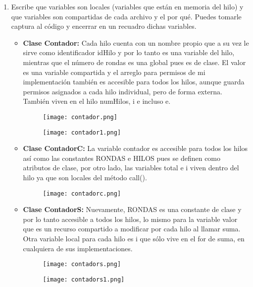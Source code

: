 \documentclass{article}
\begin{document}
\begin{enumerate}
    \item Escribe que variables son locales (variables que están en memoria del hilo) y que variables son compartidas de cada archivo y el por qué. Puedes tomarle captura al código y encerrar en un recuadro dichas variables.\\
    \begin{itemize}
        \item \textbf{Clase Contador:} Cada hilo cuenta con un nombre propio que a su vez le sirve como identificador idHilo y por lo tanto es una variable del hilo, mientras que el número de rondas es una  global pues es de clase. El valor es una variable compartida y el arreglo para permisos de mi implementación también es accesible para todos los hilos, aunque guarda permisos asignados a cada hilo individual, pero de forma externa. También viven en el hilo numHilos, i e incluso e.
        \begin{figure}[!h]
            \centering
            \texttt{[image: contador.png]}        
        \end{figure}
        \begin{figure}[!h]
            \centering
            \texttt{[image: contador1.png]}        
        \end{figure}
        \item \textbf{Clase ContadorC:} La variable contador es accesible para todos los hilos así como las constantes RONDAS e HILOS pues se definen como atributos de clase, por otro lado, las variables total e i viven dentro del hilo ya que son locales del método call().
         \begin{figure}[!h]
            \centering
            \texttt{[image: contadorc.png]}        
        \end{figure}        
        \item \textbf{Clase ContadorS:} Nuevamente, RONDAS es una constante de clase y por lo tanto accesible a todos los hilos, lo mismo para la variable valor que es un recurso compartido a modificar por cada hilo al llamar suma. Otra variable local para cada hilo es i que sólo vive en el for de suma, en cualquiera de sus implementaciones.
        \begin{figure}[!h]
            \centering
            \texttt{[image: contadors.png]}        
        \end{figure}
        \begin{figure}[!h]
            \centering
            \texttt{[image: contadors1.png]}        

\end{figure}
\end{itemize}
\end{enumerate}
\end{document}
